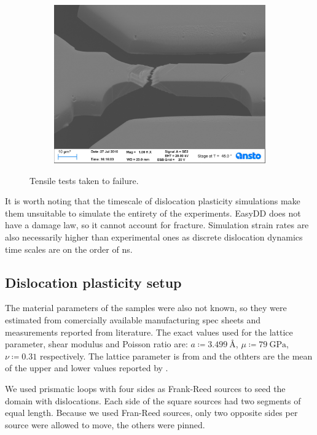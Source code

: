 \begin{figure}
\begin{subfigure}[t]{0.3\linewidth}
        \includegraphics[width=\linewidth]{../data/Ni039.jpg}
    \end{subfigure}
    \caption{Tensile tests taken to failure.}
    \label{f:tensileFailure}
\end{figure}

It is worth noting that the timescale of dislocation plasticity simulations make them unsuitable to simulate the entirety of the experiments. EasyDD does not have a damage law, so it cannot account for fracture. Simulation strain rates are also necessarily higher than experimental ones as discrete dislocation dynamics time scales are on the order of \si{\nano\second}.

\subsection{Dislocation plasticity setup}
\label{ss:modelSetup}

The material parameters of the samples were also not known, so they were estimated from comercially available manufacturing spec sheets and measurements reported from literature. The exact values used for the lattice parameter, shear modulus and Poisson ratio are: $a \coloneqq \SI{3.499}{\angstrom}$, $ \mu  \coloneqq \SI{79}{\giga\pascal}$, $\nu \coloneqq 0.31$ respectively. The lattice parameter is from \cite{ni_lattice} and the othters are the mean of the upper and lower values reported by \cite{azom_nickel}.

We used prismatic loops with four sides as Frank-Reed sources to seed the domain with dislocations. Each side of the square sources had two segments of equal length. Because we used Fran-Reed sources, only two opposite sides per source were allowed to move, the others were pinned.

